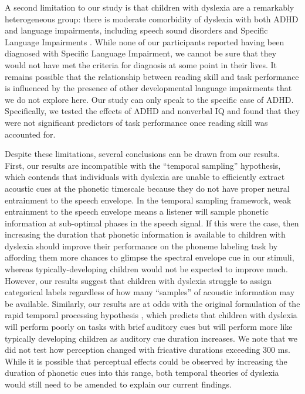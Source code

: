 \documentclass[../uwthesis.tex]{subfiles}
\begin{document}
A second limitation to our study is that children with dyslexia are a remarkably heterogeneous group: there is moderate comorbidity of dyslexia with both ADHD and language impairments, including speech sound disorders and Specific Language Impairments \cite{Germano2010, Pennington2006,Stevenson2005}. While none of our participants reported having been diagnosed with Specific Language Impairment, we cannot be sure that they would not have met the criteria for diagnosis at some point in their lives. It remains possible that the relationship between reading skill and task performance is influenced by the presence of other developmental language impairments that we do not explore here. Our study can only speak to the specific case of ADHD. Specifically, we tested the effects of ADHD and nonverbal IQ and found that they were not significant predictors of task performance once reading skill was accounted for. 

Despite these limitations, several conclusions can be drawn from our results. First, our results are incompatible with the “temporal sampling” hypothesis, which contends that individuals with dyslexia are unable to efficiently extract acoustic cues at the phonetic timescale because they do not have proper neural entrainment to the speech envelope. In the temporal sampling framework, weak entrainment to the speech envelope means a listener will sample phonetic information at sub-optimal phases in the speech signal. If this were the case, then increasing the duration that phonetic information is available to children with dyslexia should improve their performance on the phoneme labeling task by affording them more chances to glimpse the spectral envelope cue in our stimuli, whereas typically-developing children would not be expected to improve much. However, our results suggest that children with dyslexia struggle to assign categorical labels regardless of how many “samples” of acoustic information may be available. Similarly, our results are at odds with the original formulation of the rapid temporal processing hypothesis \cite{Tallal1980}, which predicts that children with dyslexia will perform poorly on tasks with brief auditory cues but will perform more like typically developing children as auditory cue duration increases. We note that we did not test how perception changed with fricative durations exceeding 300 ms. While it is possible that perceptual effects could be observed by increasing the duration of phonetic cues into this range, both temporal theories of dyslexia \cite{Goswami2011,Tallal1996} would still need to be amended to explain our current findings. 
\end{document}
